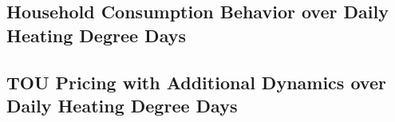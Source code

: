 \subsection{Household Consumption Behavior over Daily Heating Degree Days}
\label{Subsection:Household-Consumption-Behavior-over-Daily-Heating-Degree-Days}



\subsection{TOU Pricing with Additional Dynamics over Daily Heating Degree Days}
\label{Subsection:Time-Of-Use-Pricing-with-Additional-Dynamics-over-Daily-Heating-Degree-Days}

